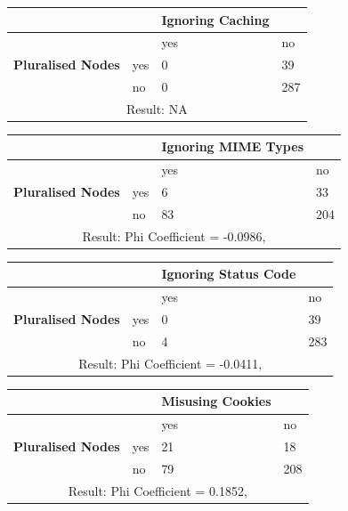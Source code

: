 \documentclass[a4paper,12pt]{article}
\begin{document}
\begin{center}
  \begin{tabular}{| p{60mm} | p{10mm} | p{35mm} | p{35mm} |}
  \hline
   & & \textbf{Ignoring Caching} &
  \\
  \hline
  & & yes & no
  \\
  \hline
  \textbf{Pluralised Nodes} & yes & 0 & 39
  \\
  \hline
   & no & 0 & 287
  \\
  \hline
  \multicolumn{4}{|c|}{Result: NA}
  \\ \hline
  \end{tabular}
  \end{center}

\begin{center}
  \begin{tabular}{| p{60mm} | p{10mm} | p{35mm} | p{35mm} |}
  \hline
   & & \textbf{Ignoring MIME Types} &
  \\
  \hline
  & & yes & no
  \\
  \hline
  \textbf{Pluralised Nodes} & yes & 6 & 33
  \\
  \hline
   & no & 83 & 204
  \\
  \hline
  \multicolumn{4}{|c|}{Result: Phi Coefficient = -0.0986, }
  \\ \hline
  \end{tabular}
  \end{center}

\begin{center}
  \begin{tabular}{| p{60mm} | p{10mm} | p{35mm} | p{35mm} |}
  \hline
   & & \textbf{Ignoring Status Code} &
  \\
  \hline
  & & yes & no
  \\
  \hline
  \textbf{Pluralised Nodes} & yes & 0 & 39
  \\
  \hline
   & no & 4 & 283
  \\
  \hline
  \multicolumn{4}{|c|}{Result: Phi Coefficient = -0.0411, }
  \\ \hline
  \end{tabular}
  \end{center}

\begin{center}
  \begin{tabular}{| p{60mm} | p{10mm} | p{35mm} | p{35mm} |}
  \hline
   & & \textbf{Misusing Cookies} &
  \\
  \hline
  & & yes & no
  \\
  \hline
  \textbf{Pluralised Nodes} & yes & 21 & 18
  \\
  \hline
   & no & 79 & 208
  \\
  \hline
  \multicolumn{4}{|c|}{Result: Phi Coefficient = 0.1852, }
  \\ \hline
  \end{tabular}
  \end{center}
\end{document}
